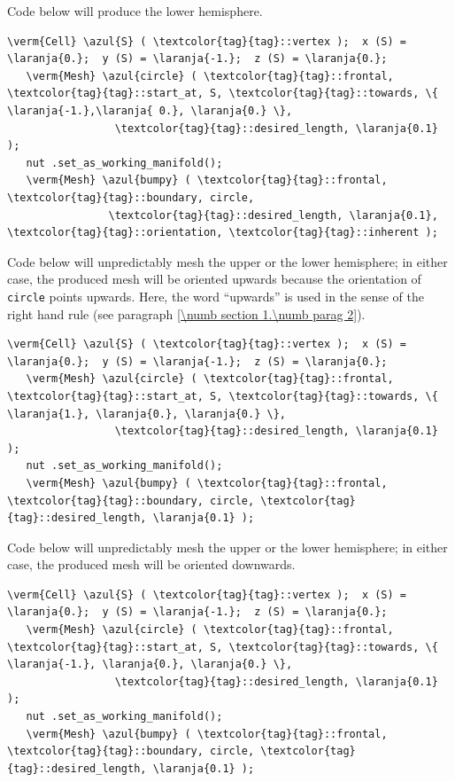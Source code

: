 Code below will produce the lower hemisphere.

\begin{Verbatim}[commandchars=\\\{\},formatcom=\small\tt,
   baselinestretch=0.94,framesep=2mm                      ]
   \verm{Cell} \azul{S} ( \textcolor{tag}{tag}::vertex );  x (S) = \laranja{0.};  y (S) = \laranja{-1.};  z (S) = \laranja{0.};
   \verm{Mesh} \azul{circle} ( \textcolor{tag}{tag}::frontal, \textcolor{tag}{tag}::start_at, S, \textcolor{tag}{tag}::towards, \{ \laranja{-1.},\laranja{ 0.}, \laranja{0.} \},
                 \textcolor{tag}{tag}::desired_length, \laranja{0.1}                                      );
   nut .set_as_working_manifold();
   \verm{Mesh} \azul{bumpy} ( \textcolor{tag}{tag}::frontal, \textcolor{tag}{tag}::boundary, circle,
                \textcolor{tag}{tag}::desired_length, \laranja{0.1}, \textcolor{tag}{tag}::orientation, \textcolor{tag}{tag}::inherent );
\end{Verbatim}

Code below will unpredictably mesh the upper or the lower hemisphere;
in either case, the produced mesh will be oriented upwards because the orientation
of {\small\tt circle} points upwards.
Here, the word ``upwards'' is used in the sense of the right hand rule
(see paragraph \ref{\numb section 1.\numb parag 2}).

\begin{Verbatim}[commandchars=\\\{\},formatcom=\small\tt,
   baselinestretch=0.94,framesep=2mm                     ]
   \verm{Cell} \azul{S} ( \textcolor{tag}{tag}::vertex );  x (S) = \laranja{0.};  y (S) = \laranja{-1.};  z (S) = \laranja{0.};
   \verm{Mesh} \azul{circle} ( \textcolor{tag}{tag}::frontal, \textcolor{tag}{tag}::start_at, S, \textcolor{tag}{tag}::towards, \{ \laranja{1.}, \laranja{0.}, \laranja{0.} \},
                 \textcolor{tag}{tag}::desired_length, \laranja{0.1}                                     );
   nut .set_as_working_manifold();
   \verm{Mesh} \azul{bumpy} ( \textcolor{tag}{tag}::frontal, \textcolor{tag}{tag}::boundary, circle, \textcolor{tag}{tag}::desired_length, \laranja{0.1} );
\end{Verbatim}

Code below will unpredictably mesh the upper or the lower hemisphere;
in either case, the produced mesh will be oriented downwards.

\begin{Verbatim}[commandchars=\\\{\},formatcom=\small\tt,
   baselinestretch=0.94,framesep=2mm                     ]
   \verm{Cell} \azul{S} ( \textcolor{tag}{tag}::vertex );  x (S) = \laranja{0.};  y (S) = \laranja{-1.};  z (S) = \laranja{0.};
   \verm{Mesh} \azul{circle} ( \textcolor{tag}{tag}::frontal, \textcolor{tag}{tag}::start_at, S, \textcolor{tag}{tag}::towards, \{ \laranja{-1.}, \laranja{0.}, \laranja{0.} \},
                 \textcolor{tag}{tag}::desired_length, \laranja{0.1}                                      );
   nut .set_as_working_manifold();
   \verm{Mesh} \azul{bumpy} ( \textcolor{tag}{tag}::frontal, \textcolor{tag}{tag}::boundary, circle, \textcolor{tag}{tag}::desired_length, \laranja{0.1} );
\end{Verbatim}


